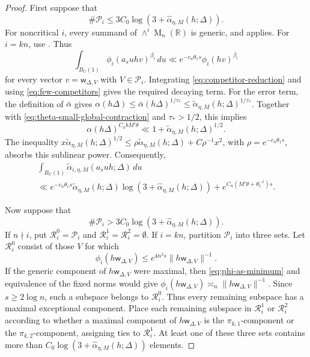 \documentclass[reqno,11pt]{amsart}
\numberwithin{equation}{section}
\theoremstyle{definition}
\theoremstyle{remark}
\newcommand{\op}{\operatorname}
\newcommand{\M}{\op{M}}
\begin{document}
\begin{proof}
 First suppose that
\begin{equation}\label{eq:few-competitors}
\#\mathcal P_i
\le 3C_0\log(3+\widehat{\alpha}_{\eta,M}(h;\Delta)).
\end{equation}
For noncritical $i$, every summand of $\wedge^i\M_n(\mathbb R)$ is
generic, and 
applies. For $i=kn$, use
. Thus
$$
\int_{B_{U}(1)}
\phi_i(a_suhv)^{\beta_i}\,du
\ll e^{-c_n\theta_1 s}\phi_i(hv)^{\beta_i}
$$
for every vector $v=\mathsf{w}_{\Delta,V}$ with $V\in \mathcal P_i$. Integrating \eqref{eq:competitor-reduction} and using
\eqref{eq:few-competitors} gives the required decaying term. For the error
term, the definition of $\bar\alpha$ gives $\alpha(h\Delta)
\le \bar\alpha(h\Delta)^{1/\tau_*}
\le \widetilde\alpha_{\eta,M}(h;\Delta)^{1/\tau_*}$.
Together with \eqref{eq:theta-small-global-contraction} and
$\tau_*>1/2$, this implies
$$
\alpha(h\Delta)^{C_nbM'\theta}
\ll 1+\widetilde\alpha_{\eta,M}(h;\Delta)^{1/2}.
$$
The inequality
$x\widetilde\alpha_{\eta,M}(h;\Delta)^{1/2}
\le \rho\widetilde\alpha_{\eta,M}(h;\Delta)+C\rho^{-1}x^2$, with
$\rho=e^{-c_n\theta_1 s}$, absorbs this sublinear power. Consequently,
\begin{multline}\label{eq:few-competitors-bound}
\int_{B_{U}(1)}
\widetilde\alpha_{i,\eta,M}(a_suh;\Delta)\,du
\\ \ll
 e^{-c_n\theta_1 s}\widetilde\alpha_{\eta,M}(h;\Delta)
 \log(3+\widehat{\alpha}_{\eta,M}(h;\Delta))
+e^{C_n(M'\theta+\theta_1^{-1})s}.
\end{multline}

 Now suppose that
\begin{equation}\label{large}
\#\mathcal P_i
> 3C_0\log(3+\widehat{\alpha}_{\eta,M}(h;\Delta)).
\end{equation} If $n\nmid i$, put
$\mathcal R_i^0=\mathcal P_i$ and
$\mathcal R_i^1=\mathcal R_i^2=\emptyset$. If $i=kn$, partition
$\mathcal P_i$ into three sets. Let $\mathcal R_i^0$ consist of
those $V$ for which
$$
\phi_i(h\mathsf w_{\Delta,V})
\le e^{4n^3s}\|h\mathsf w_{\Delta,V}\|^{-1}.
$$
If the generic component of $h\mathsf w_{\Delta,V}$ were maximal, then
\eqref{eq:phi-as-minimum} and equivalence of the fixed norms would give
$\phi_i(h\mathsf w_{\Delta,V})\asymp_n
\|h\mathsf w_{\Delta,V}\|^{-1}$. Since $s\ge2\log n$, such a subspace
belongs to $\mathcal R_i^0$. Thus every remaining subspace has a maximal
exceptional component.
Place each remaining subspace in $\mathcal R_i^1$ or
$\mathcal R_i^2$ according to whether a maximal component of
$h\mathsf w_{\Delta,V}$ is the $\pi_{k,1}$-component or the
$\pi_{k,2}$-component, assigning ties to $\mathcal R_i^1$. At least one of
these three sets contains more than
$C_0\log(3+\widehat{\alpha}_{\eta,M}(h;\Delta))$ elements.



\end{proof}
\end{document}
